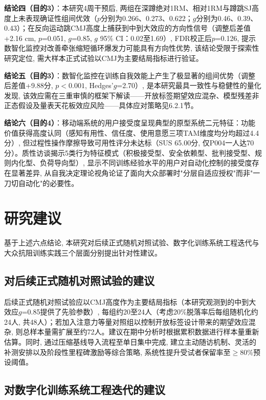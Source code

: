\textbf{结论四（目的3）}：本研究4周干预后, 两组在深蹲绝对1RM、相对1RM与蹲跳SJ高度上未表现确证性组间优效（$p$分别为0.266、0.273、0.622；$g$分别为0.46、0.39、0.43）；在反向运动跳CMJ高度上捕获到中到大效应的方向性信号（调整后差值+2.16 cm, $p$=0.051, $g$=0.85, $g$ 95\% CI：0.02至1.69）, FDR校正后$p$=0.126, 提示数智化监控对改善牵张缩短循环爆发力可能具有方向性优势, 该结论受限于探索性研究定位, 需大样本正式试验以CMJ为主要结局指标进行验证。

\textbf{结论五（目的3）}：数智化监控在训练自我效能上产生了极显著的组间优势（调整后差值+9.88分, $p<0.001$, Hedges'$g$=2.70）, 是本研究最具一致性与稳健性的量化发现, 该效应需在三重审慎的框架下解读——开放标签期望效应混杂、模型残差非正态假设及量表天花板效应风险——具体应对策略见6.2.1节。

\textbf{结论六（目的4）}：移动端系统的用户接受度呈现典型的原型系统二元特征：功能价值获得高度认同（感知有用性、信任度、使用意愿三项TAM维度均分均超过4.4分）, 但过程性操作摩擦导致可用性评分未达标（SUS 65.00分, 仅P004一人达70分）。质性访谈揭示5类行为特征模式（积极接受型、安全依赖型、批判接受型、规则内化型、负荷导向型）, 显示不同训练经验水平的用户对自动化控制的接受度存在显著差异, 从自我决定理论视角论证了面向大众部署时"分层自适应授权"而非"一刀切自动化"的必要性。

\section{研究建议}
\label{sec:recommendations}

基于上述六点结论, 本研究对后续正式随机对照试验、数字化训练系统工程迭代与大众抗阻训练实践三个层面分别提出针对性建议。

\subsection{对后续正式随机对照试验的建议}
\label{sec:rct_recommendation}

后续正式随机对照试验应以CMJ高度作为主要结局指标（本研究观测到的中到大效应$g$=0.85提供了先验参数）, 每组约20至24人（考虑20\%脱落率后每组随机化约24人, 共48人）；若加入注意力等量对照组以控制开放标签设计带来的期望效应混杂, 则总样本量需扩展至约72人。建议在期中分析时根据累积数据进行样本量重新估算。同时, 通过压缩基线导入流程至单日集中完成, 建立主动随访机制、灵活的补测安排以及阶段性里程碑激励等综合策略, 系统性提升受试者保留率至$\geq$80\%预设阈值。

\subsection{对数字化训练系统工程迭代的建议}
\label{sec:system_recommendation}

